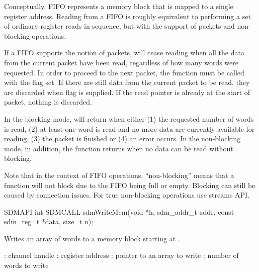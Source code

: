 \documentclass[a4paper,12pt,twoside,extrafontsizes]{memoir}
\begin{document}
\begin{funcremarks}
	Conceptually, FIFO represents a memory block that is mapped to a single register address. Reading from a FIFO is roughly equivalent to performing a set of ordinary register reads in sequence, but with the support of packets and non-blocking operations.

	If a FIFO supports the notion of packets,  will cease reading when all the data from the current packet have been read, regardless of how many words were requested. In order to proceed to the next packet, the function must be called with the  flag set. If there are still data from the current packet to be read, they are discarded when  flag is supplied. If the read pointer is already at the start of packet, nothing is discarded.

	In the blocking mode,  will return when either (1) the requested number of words is read, (2) at least one word is read and no more data are currently available for reading, (3) the packet is finished or (4) an error occurs. In the non-blocking mode, in addition, the function returns when no data can be read without blocking.

	Note that in the context of FIFO operations, ``non-blocking'' means that a function will not block due to the FIFO being full or empty. Blocking can still be caused by connection issues. For true non-blocking operations use streams API.
\end{funcremarks}



\begin{cfuncprototype}
SDMAPI int SDMCALL sdmWriteMem(void *h, sdm_addr_t addr, const sdm_reg_t *data, size_t n);
\end{cfuncprototype}

\begin{funcdescr}
	Writes an array of words to a memory block starting at .
\end{funcdescr}

\begin{funcparams}
	: channel handle
	: register address
	: pointer to an array to write
	: number of words to write
\end{funcparams}
\end{document}
